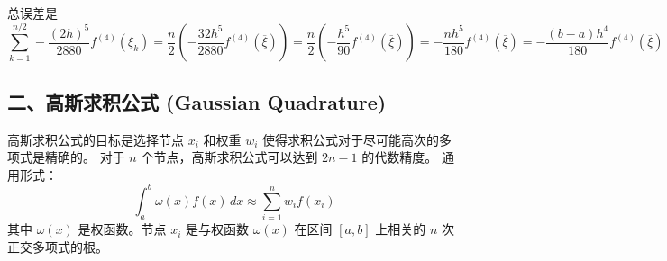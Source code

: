 总误差是
\[
\sum_{k=1}^{n/2} -\frac{(2h)^5}{2880} f^{(4)}(\xi_k) = \frac{n}{2} \left( -\frac{32h^5}{2880} f^{(4)}(\overline{\xi}) \right) = \frac{n}{2} \left( -\frac{h^5}{90} f^{(4)}(\overline{\xi}) \right) = -\frac{nh^5}{180} f^{(4)}(\overline{\xi}) = -\frac{(b-a)h^4}{180} f^{(4)}(\overline{\xi})
\]
\subsection{二、高斯求积公式 (Gaussian Quadrature)}

高斯求积公式的目标是选择节点 $x_i$ 和权重 $w_i$ 使得求积公式对于尽可能高次的多项式是精确的。
对于 $n$ 个节点，高斯求积公式可以达到 $2n-1$ 的代数精度。
通用形式：
\[
\int_a^b \omega(x) f(x) \, dx \approx \sum_{i=1}^n w_i f(x_i)
\]
其中 $\omega(x)$ 是权函数。节点 $x_i$ 是与权函数 $\omega(x)$ 在区间 $[a,b]$ 上相关的 $n$ 次正交多项式的根。

